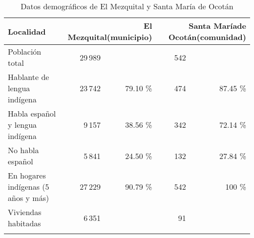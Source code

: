 \documentclass[output=paper]{../langscibook}
\begin{document}

\begin{table}
\caption{\label{tab:guerrero:5} Datos demográficos de El Mezquital y Santa María de Ocotán \citep{INEGI2010}}
\begin{tabularx}{\textwidth}{Xrrrr}
\lsptoprule
Localidad & \multicolumn{2}{p{2.5cm}}{El Mezquital\newline  (municipio)} & \multicolumn{2}{p{2.5cm}}{Santa María\newline de Ocotán\newline (comunidad)}\\
\midrule
Población total &  29\,989 && 542 &\\
Hablante de lengua indígena & 23\,742 &79.10 \%& 474 & 87.45 \%\\
Habla español y lengua indígena & 9\,157 &38.56 \%& 342 & 72.14 \% \\
No habla español & 5\,841 & 24.50 \% &  132 & 27.84 \% \\
En hogares indígenas (5 años y más)& 27\,229 & 90.79 \%&  542 & 100 \% \\
Viviendas habitadas & 6\,351  &&  91 & \\
\lspbottomrule
\end{tabularx}
\end{table}
\end{document}
